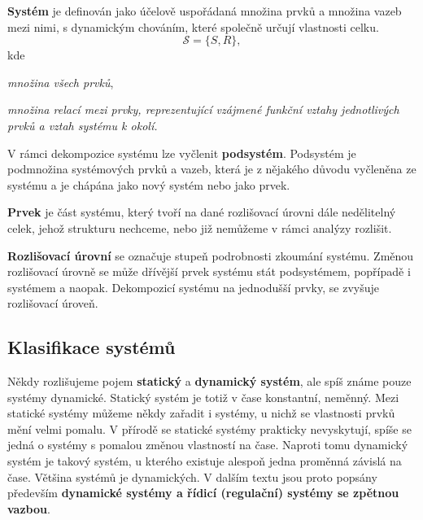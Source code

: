 {       \begin{definition}
        \textbf{Systém} je definován jako účelově uspořádaná množina prvků a množina vazeb mezi 
        nimi, s dynamickým chováním, které společně určují vlastnosti celku.
        \begin{equation}
          \mathscr{S} = \{S,R \},
        \end{equation}
        kde
        \begin{description}[leftmargin=5em,style=nextline]
          \item[\hspace{2em}\(S \ldots\)] \emph{množina všech prvků},
          \item[\hspace{2em}\(R \ldots\)] \emph{množina relací mezi prvky, reprezentující vzájmené 
                                         funkční vztahy jednotlivých prvků a vztah systému k okolí.}
        \end{description}
       \end{definition}
       
       V rámci dekompozice systému lze vyčlenit \textbf{podsystém}. Podsystém je podmnožina
       systémových prvků a vazeb, která je z nějakého důvodu vyčleněna ze systému a je chápána
       jako nový systém nebo jako prvek.
       
       \begin{definition}
        \textbf{Prvek} je část systému, který tvoří na dané rozlišovací úrovni dále nedělitelný 
        celek, jehož strukturu nechceme, nebo již nemůžeme v rámci analýzy rozlišit.
       \end{definition}
       
       \begin{note}
         \textbf{Rozlišovací úrovní} se označuje stupeň podrobnosti zkoumání systému. Změnou        
         rozlišovací úrovně se může dřívější prvek systému stát podsystémem, popřípadě i systémem a 
         naopak. Dekompozicí systému na jednodušší prvky, se zvyšuje rozlišovací úroveň.
       \end{note}
       
     \subsection{Klasifikace systémů}
       Někdy rozlišujeme pojem \textbf{statický} a \textbf{dynamický systém}, ale spíš známe pouze 
       systémy dynamické. Statický systém je totiž v čase konstantní, neměnný. Mezi statické 
       systémy můžeme někdy zařadit i systémy, u nichž se vlastnosti prvků mění velmi pomalu. V 
       přírodě se statické systémy prakticky nevyskytují, spíše se jedná o systémy s pomalou změnou 
       vlastností na čase. Naproti tomu dynamický systém je takový systém, u kterého existuje 
       alespoň jedna proměnná závislá na čase. Většina systémů je dynamických. V dalším textu jsou 
       proto popsány především \textbf{dynamické systémy a řídicí (regulační) systémy se zpětnou 
       vazbou}.
       
}
